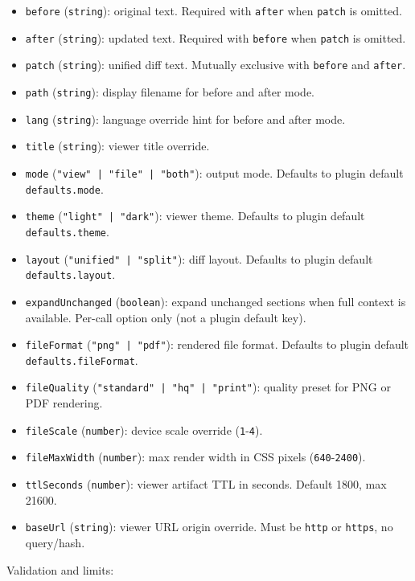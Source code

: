 \begin{itemize}
  \item \texttt{before} (\texttt{string}): original text. Required with \texttt{after} when \texttt{patch} is omitted.
  \item \texttt{after} (\texttt{string}): updated text. Required with \texttt{before} when \texttt{patch} is omitted.
  \item \texttt{patch} (\texttt{string}): unified diff text. Mutually exclusive with \texttt{before} and \texttt{after}.
  \item \texttt{path} (\texttt{string}): display filename for before and after mode.
  \item \texttt{lang} (\texttt{string}): language override hint for before and after mode.
  \item \texttt{title} (\texttt{string}): viewer title override.
  \item \texttt{mode} (\texttt{"view" | "file" | "both"}): output mode. Defaults to plugin default \texttt{defaults.mode}.
  \item \texttt{theme} (\texttt{"light" | "dark"}): viewer theme. Defaults to plugin default \texttt{defaults.theme}.
  \item \texttt{layout} (\texttt{"unified" | "split"}): diff layout. Defaults to plugin default \texttt{defaults.layout}.
  \item \texttt{expandUnchanged} (\texttt{boolean}): expand unchanged sections when full context is available. Per-call option only (not a plugin default key).
  \item \texttt{fileFormat} (\texttt{"png" | "pdf"}): rendered file format. Defaults to plugin default \texttt{defaults.fileFormat}.
  \item \texttt{fileQuality} (\texttt{"standard" | "hq" | "print"}): quality preset for PNG or PDF rendering.
  \item \texttt{fileScale} (\texttt{number}): device scale override (\texttt{1}-\texttt{4}).
  \item \texttt{fileMaxWidth} (\texttt{number}): max render width in CSS pixels (\texttt{640}-\texttt{2400}).
  \item \texttt{ttlSeconds} (\texttt{number}): viewer artifact TTL in seconds. Default 1800, max 21600.
  \item \texttt{baseUrl} (\texttt{string}): viewer URL origin override. Must be \texttt{http} or \texttt{https}, no query/hash.
\end{itemize}


Validation and limits:

